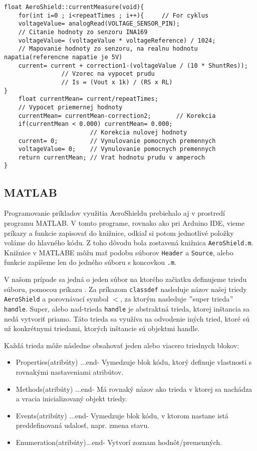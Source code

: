 \begin{lstlisting}[caption={Zdrojový kód funkcie currentMeasure.},captionpos=b]	
float AeroShield::currentMeasure(void){  
	for(int i=0 ; i<repeatTimes ; i++){     // For cyklus
	voltageValue= analogRead(VOLTAGE_SENSOR_PIN);     
	// Citanie hodnoty zo senzoru INA169 
	voltageValue= (voltageValue * voltageReference) / 1024;    
	// Mapovanie hodnoty zo senzoru, na realnu hodnotu napatia(referencne napatie je 5V)
	current= current + correction1-(voltageValue / (10 * ShuntRes));    
                // Vzorec na vypocet prudu
                // Is = (Vout x 1k) / (RS x RL)
}                                                                         	
	float currentMean= current/repeatTimes;   
	// Vypocet priemernej hodnoty  
	currentMean= currentMean-correction2;       // Korekcia
	if(currentMean < 0.000) currentMean= 0.000;                 
	                    // Korekcia nulovej hodnoty
	current= 0;         // Vynulovanie pomocnych premennych   
	voltageValue= 0;    // Vynulovanie pomocnych premennych   
	return currentMean; // Vrat hodnotu prudu v amperoch
}
\end{lstlisting}
	
\subsection{MATLAB}	
	
Programovanie príkladov využitia AeroShieldu prebiehalo aj v prostredí programu MATLAB. V tomto programe, rovnako ako pri Arduino IDE, vieme príkazy a funkcie zapisovať do knižnice, odkiaľ si potom jednotlivé položky voláme do hlavného kódu. Z toho dôvodu bola zostavená knižnica \verb|AeroShield.m|. Knižnice v MATLABE môžu mať podobu súborov \verb|Header| a \verb|Source|, alebo funkcie zapíšeme len do jedného súboru s koncovkou \verb|.m|. 

V našom prípade sa jedná o jeden súbor na ktorého začiatku definujeme triedu súboru, pomocou príkazu . Za príkazom \verb|classdef| nasleduje názov našej triedy \verb|AeroShield| a porovnávací symbol $<$, za ktorým nasleduje $"$super trieda$"$ \verb|handle|. Super, alebo nad-trieda \verb|handle| je abstraktná trieda, ktorej inštancia sa nedá vytvoriť priamo. Táto trieda sa využíva na odvodenie iných tried, ktoré sú už konkrétnymi triedami, ktorých inštancie sú objektmi handle. 

Každá trieda môže následne obsahovať jeden alebo viacero triednych blokov: 
\begin{itemize}
	\item Properties(atribúty) ...end- Vymedzuje blok kódu, ktorý definuje vlastnosti s rovnakými nastaveniami atribútov.
	\item Methods(atribúty)    ...end- Má rovnaký názov ako trieda v ktorej sa nachádza a vracia inicializovaný objekt triedy.
	\item Events(atribúty)     ...end- Vymedzuje blok kódu, v ktorom nastane istá preddefinovaná udalosť, napr. zmena stavu. 
	\item Enumeration(atribúty)...end- Vytvorí zoznam hodnôt/premenných. 
\end{itemize}

